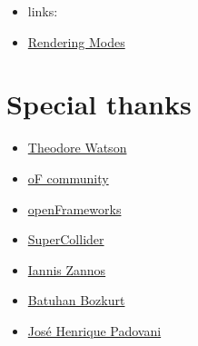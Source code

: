 \documentclass[08pt, a4paper]{scrartcl}
\begin{document}
\begin{itemize}
\item links:
\item \href{http://processingjs.org/reference/articles/RenderingModes}{Rendering Modes}
\end{itemize}
\section{Special thanks}
\label{sec-8}

\begin{itemize}
\item \href{https://github.com/ofTheo/ofxKinect}{Theodore Watson}
\item \href{http://forum.openframeworks.cc/index.php?topic=4947.0}{oF community}
\item \href{http://www.openframeworks.cc/}{openFrameworks}
\item \href{http://supercolliderbook.net/}{SuperCollider}
\item \href{http://earlab.org/}{Iannis Zannos}
\item \href{http://www.earslap.com/}{Batuhan Bozkurt}
\item \href{http://zepadovani.info}{José Henrique Padovani}
\end{itemize}
\end{document}
